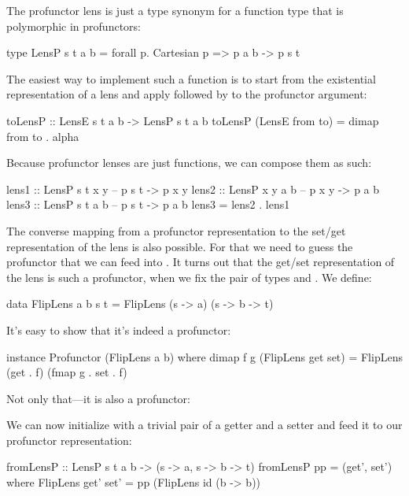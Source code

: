 \documentclass[DaoFP]{subfiles}
\begin{document}
The profunctor lens is just a type synonym for a function type that is polymorphic in  profunctors:
\begin{haskell}
type LensP s t a b = forall p. Cartesian p => p a b -> p s t
\end{haskell}

The easiest way to implement such a function is to start from the existential representation of a lens and apply  followed by  to the profunctor argument:
\begin{haskell}
toLensP :: LensE s t a b -> LensP s t a b
toLensP (LensE from to) = dimap from to . alpha
\end{haskell}

Because profunctor lenses are just functions, we can compose them as such:
\begin{haskell}
lens1 :: LensP s t x y 
-- p s t -> p x y
lens2 :: LensP x y a b 
-- p x y -> p a b
lens3 :: LensP s t a b 
-- p s t -> p a b
lens3 = lens2 . lens1
\end{haskell}

The converse mapping from a profunctor representation to the set/get representation of the lens is also possible. For that we need to guess the profunctor that we can feed into . It turns out that the get/set representation of the lens is such a profunctor, when we fix the pair of types  and . We define:
\begin{haskell}
data FlipLens a b s t = FlipLens (s -> a) (s -> b -> t)
\end{haskell}
It's easy to show that it's indeed a profunctor:
\begin{haskell}
instance Profunctor (FlipLens a b) where
  dimap f g (FlipLens get set) = FlipLens (get . f) (fmap g . set . f)
\end{haskell}
Not only that---it is also a  profunctor:
We can now initialize  with a trivial pair of a getter and a setter and feed it to our profunctor representation:
\begin{haskell}
fromLensP :: LensP s t a b -> (s -> a, s -> b -> t)
fromLensP pp = (get', set')
  where FlipLens get' set' = pp (FlipLens id (\s b -> b))
\end{haskell}
\end{document}
